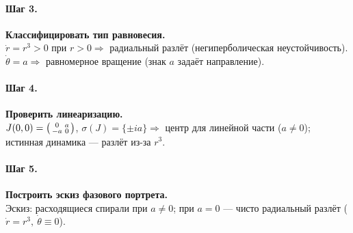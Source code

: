 \paragraph{Шаг 3.} \textbf{Классифицировать тип равновесия.}\\
\(\dot r=r^{3}>0\) при \(r>0\Rightarrow\) радиальный разлёт (негиперболическая неустойчивость).
\(\dot\theta=a\Rightarrow\) равномерное вращение (знак \(a\) задаёт направление).

\paragraph{Шаг 4.} \textbf{Проверить линеаризацию.}\\
\(J(0,0)=\begin{psmallmatrix}0&a\\ -a&0\end{psmallmatrix}\), \(\sigma(J)=\{\pm i a\}\Rightarrow\) центр для линейной части (\(a\neq0\)); истинная динамика — разлёт из-за \(r^{3}\).

\paragraph{Шаг 5.} \textbf{Построить эскиз фазового портрета.}\\
Эскиз: расходящиеся спирали при \(a\neq0\); при \(a=0\) — чисто радиальный разлёт (\(\dot r=r^{3},\ \dot\theta\equiv0\)).



